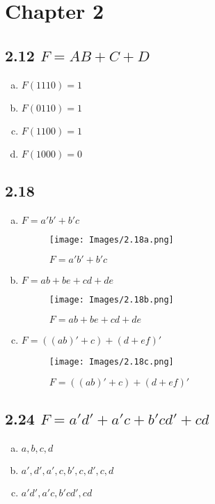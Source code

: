\section*{Chapter 2}
\subsection*{2.12 $F=AB+C+D$}
\begin{enumerate}[(a)]
    \item $F(1110)=1$
    \item $F(0110)=1$
    \item $F(1100)=1$
    \item $F(1000)=0$
\end{enumerate}

\subsection*{2.18}
\begin{enumerate}[(a)]
    \item $F=a'b'+b'c$
    \begin{figure}[!ht]
        \centering
        \texttt{[image: Images/2.18a.png]}
        \caption{$F=a'b'+b'c$}
    \end{figure}
    
    \clearpage
    \item $F=ab+be+cd+de$
    \begin{figure}[!ht]
        \centering
        \texttt{[image: Images/2.18b.png]}
        \caption{$F=ab+be+cd+de$}
    \end{figure}
    
    \item $F=((ab)'+c)+(d+ef)'$
    \begin{figure}[!ht]
        \centering
        \texttt{[image: Images/2.18c.png]}
        \caption{$F=((ab)'+c)+(d+ef)'$}
    \end{figure}
\end{enumerate}

\subsection*{2.24 $F=a'd'+a'c+b'cd'+cd$}
\begin{enumerate}[(a)]
    \item $a,b,c,d$
    \item $a',d',a',c,b',c,d',c,d$
    \item $a'd',a'c,b'cd',cd$
\end{enumerate}

